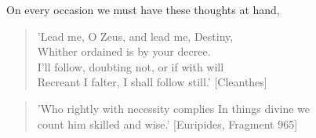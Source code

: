 On every occasion we must have these thoughts at hand,

\begin{quote}
  'Lead me, O Zeus, and lead me, Destiny, \\
  Whither ordained is by your decree. \\
  I'll follow, doubting not, or if with will \\
  Recreant I falter, I shall follow still.' [Cleanthes] 
\end{quote}

\begin{quote}
  'Who rightly with necessity complies In things divine we \\
  count him skilled and wise.' [Euripides, Fragment 965]
\end{quote}

